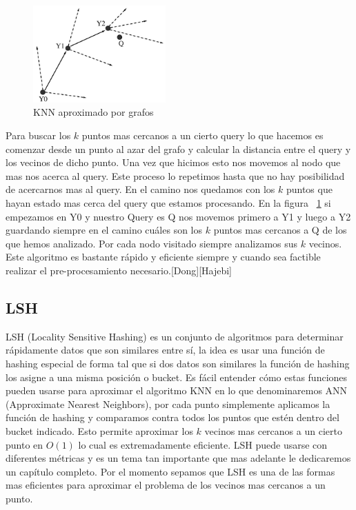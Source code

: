 \begin{figure}[!htb]
\centering
\includegraphics[width=2in]{figures/knn-graphs-fig.png}

\caption{KNN aproximado por grafos}
\label{fig:knngrafos}
\end{figure}

Para buscar los $k$ puntos mas cercanos a un cierto query lo que hacemos es comenzar desde un punto al azar del grafo y calcular la distancia entre el query y los vecinos de dicho punto. Una vez que hicimos esto nos movemos al nodo que mas nos acerca al query. Este proceso lo repetimos hasta que no hay posibilidad de acercarnos mas al query. En el camino nos quedamos con los $k$ puntos que hayan estado mas cerca del query que estamos procesando. 
En la figura ~\ref{fig:knngrafos} si empezamos en Y0 y nuestro Query es Q nos movemos primero a Y1 y luego a Y2 guardando siempre en el camino cuáles son los $k$ puntos mas cercanos a Q de los que hemos analizado. Por cada nodo visitado siempre analizamos sus $k$ vecinos.
Este algoritmo es bastante rápido y eficiente siempre y cuando sea factible realizar el pre-procesamiento necesario.[Dong][Hajebi]

\subsection{LSH}

LSH (Locality Sensitive Hashing) es un conjunto de algoritmos para determinar rápidamente datos que son similares entre sí, la idea es usar una función de hashing especial de forma tal que si dos datos son similares la función de hashing los asigne a una misma posición o bucket. Es fácil entender cómo estas funciones pueden usarse para aproximar el algoritmo KNN en lo que denominaremos ANN (Approximate Nearest Neighbors), por cada punto simplemente aplicamos la función de hashing y comparamos contra todos los puntos que estén dentro del bucket indicado. Esto permite aproximar los $k$ vecinos mas cercanos a un cierto punto en $O(1)$ lo cual es extremadamente eficiente. 
LSH  puede usarse con diferentes métricas y es un tema tan importante que mas adelante le dedicaremos un capítulo completo. Por el momento sepamos que LSH es una de las formas mas eficientes para aproximar el problema de los vecinos mas cercanos a un punto. 

